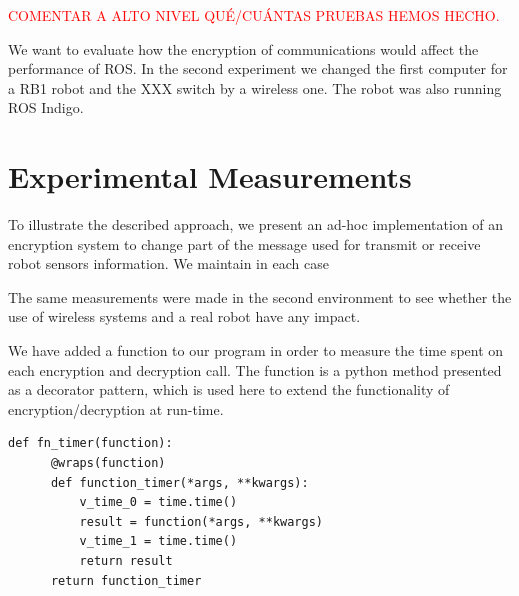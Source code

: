 \documentclass[journal,twoside]{JoPhA}
\begin{document}
\textcolor{red}{COMENTAR A ALTO NIVEL QU\'E/CU\'ANTAS PRUEBAS HEMOS HECHO.}

We want to evaluate how the encryption of communications would affect the performance of ROS.
In the second experiment we changed the first computer for a RB1 robot and the XXX switch by a wireless one. The robot was also running ROS Indigo.




\section{Experimental Measurements}

To illustrate the described approach, we present an ad-hoc implementation of an encryption system to change part of the message used for transmit or receive robot sensors information. 
We maintain in each case 


The same measurements were made in the second environment to see whether the use of wireless systems and a real robot have any impact.



We have added a function to our program in order to measure the time spent on each encryption and decryption call. The function is a python method presented as a decorator pattern, which is used here to extend the functionality of encryption/decryption at run-time. 


{
  \footnotesize{
    \begin{Verbatim}[frame=single]
def fn_timer(function):
	  @wraps(function)
	  def function_timer(*args, **kwargs):
	      v_time_0 = time.time()
	      result = function(*args, **kwargs)
	      v_time_1 = time.time()
	      return result
	  return function_timer
    \end{Verbatim}
  }
}
\end{document}
